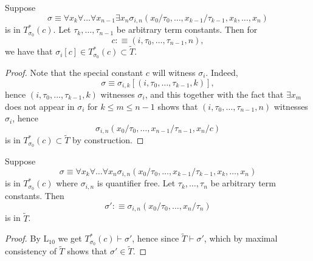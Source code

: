 \begin{lemma}
    Suppose 
    $$
        \sigma\equiv \forall x_k\forall \dots\forall x_{n-1}\exists x_n\sigma_{i,n}(x_0/\tau_0,\dots,x_{k-1}/\tau_{k-1},x_k,\dots,x_n)
    $$
    is in $T_{\sigma_0}^\ast(c)$. Let $\tau_k,\dots,\tau_{n-1}$ be arbitrary term constants. Then for 
    $$
        c :\equiv (i,\tau_0,\dots,\tau_{n-1},n),
    $$
    we have that $\sigma_i[c]\in T^\ast_{\sigma_0}(c)\subset \widetilde{T}$.
\end{lemma}
\begin{proof}
Note that the special constant $c$ will witness $\sigma_i$. Indeed, 
$$
    \sigma \equiv \sigma_{i,k}[(i,\tau_0,\dots,\tau_{k-1},k)],
$$
hence $ (i,\tau_0,\dots,\tau_{k-1},k)$ witnesses $\sigma_i$, and this together with the fact that $\exists x_m$ does not appear in $\sigma_i$ for $k\leq m\leq n-1$ shows that $(i,\tau_0,\dots, \tau_{n-1},n)$ witnesses $\sigma_i$, hence 
$$
    \sigma_{i,n}(x_0/\tau_0,\dots,x_{n-1}/\tau_{n-1},x_n/c)
$$
is in $T_{\sigma_0}^\ast(c)\subset \widetilde{T}$ by construction.
\end{proof}
\begin{lemma}
    Suppose 
    $$
        \sigma\equiv \forall x_k\forall \dots\forall x_n\sigma_{i,n}(x_0/\tau_0,\dots,x_{k-1}/\tau_{k-1},x_k,\dots,x_n)
    $$
    is in $T_{\sigma_0}^\ast(c)$ where $\sigma_{i,n}$ is quantifier free. Let $\tau_k,\dots,\tau_n$ be arbitrary term constants. Then 
    $$
        \sigma' :\equiv \sigma_{i,n}(x_0/\tau_0,\dots,x_n/\tau_n)
    $$
    is in $\widetilde{T}$. 
\end{lemma}
\begin{proof}
    By $\mathrm{L}_{10}$ we get $T_{\sigma_0}^\ast(c)\vdash \sigma'$, hence since $\widetilde{T}\vdash \sigma'$, which by maximal consistency of $\widetilde{T}$ shows that $\sigma'\in \widetilde{T}$.
\end{proof}
